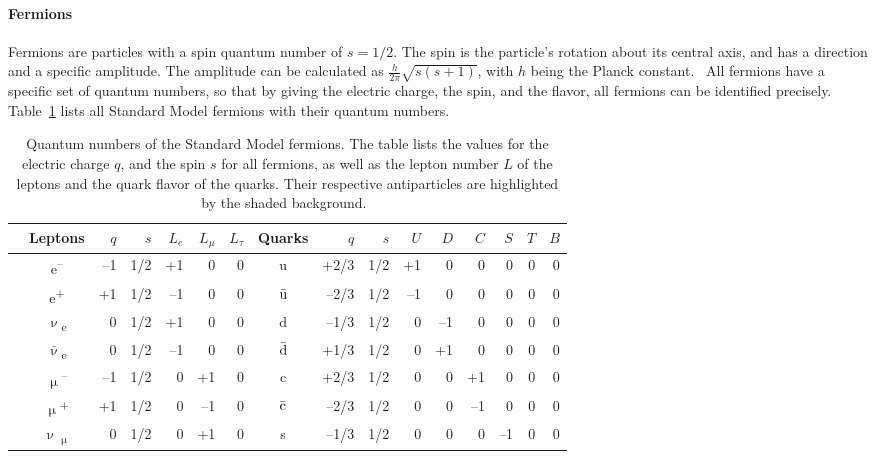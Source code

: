 \paragraph{Fermions}
Fermions are particles with a spin quantum number of $s = 1/2$. 
The spin is the particle's rotation about its central axis, and has a direction and a specific amplitude.
The amplitude can be calculated as $\frac{h}{2\pi}\sqrt{s(s+1)}$, with $h$ being the Planck constant.~\cite[p. 121]{Griffiths}
All fermions have a specific set of quantum numbers, so that by giving the electric charge, the spin, and the flavor,  all fermions can be identified precisely.
Table~\ref{tab:Fermions} lists all Standard Model fermions with their quantum numbers.
\begin{table}
\caption[Quantum numbers of the Standard Model fermions]{Quantum numbers of the Standard Model fermions. The table lists the values for the electric charge $q$, and the spin $s$ for all fermions, as well as the lepton number $L$ of the leptons and the quark flavor of the quarks. Their respective antiparticles are highlighted by the shaded background.~\cite[cf. p. 49]{Griffiths}}
\label{tab:Fermions}
\centering
\begin{tabularx}{\textwidth}{c|c|rrrrr|@{\hskip 0.03in}|c|rrrrrrrr}
\hline\hline
& Leptons & $q$ & $s$ & $L_e$ & $L_{\mu}$ & $L_{\tau}$ & Quarks & $q$ & $s$ & $U$ & $D$ & $C$ & $S$ & $T$ & $B$\\
\hline
& e\textsuperscript{--} & --1 & 1/2 & +1 & 0 & 0 & u & +2/3 & 1/2 & +1 & 0 & 0 & 0 & 0 & 0\\
\rowcolor{Gray}
\cellcolor{white}& e\textsuperscript{+} & +1 & 1/2 & --1 & 0 & 0 & $\bar{\rm{u}}$ & --2/3 & 1/2 & --1 & 0 & 0 & 0 & 0 & 0\\
& $\upnu$\textsubscript{e} & 0 & 1/2 & +1 & 0 & 0 & d & --1/3 & 1/2 & 0 & --1 & 0 & 0 & 0 & 0\\
\rowcolor{Gray}
\multirow{-4}{*}{\rotatebox[origin=c]{90}{\parbox[c]{1.9cm}{\centering First generation}}} &$\bar\upnu$\textsubscript{e} & 0 & 1/2 & --1 & 0 & 0 & $\bar{\rm{d}}$ & +1/3 & 1/2 & 0 & +1 & 0 & 0 & 0 & 0\\
\hline
& $\upmu$\textsuperscript{--} & --1 & 1/2 & 0 & +1 & 0 & c & +2/3 & 1/2 & 0 & 0 & +1 & 0 & 0 & 0\\
\rowcolor{Gray}
\cellcolor{white}&$\upmu$\textsuperscript{+} & +1 & 1/2 & 0 & --1 & 0 & $\bar{\rm{c}}$ & --2/3 & 1/2 & 0 & 0 & --1 & 0 & 0 & 0\\
& $\upnu$\textsubscript{$\upmu$} & 0 & 1/2 & 0 & +1 & 0 & s & --1/3 & 1/2 & 0 & 0 & 0 & --1 & 0 & 0\\

\end{tabularx}
\end{table}
